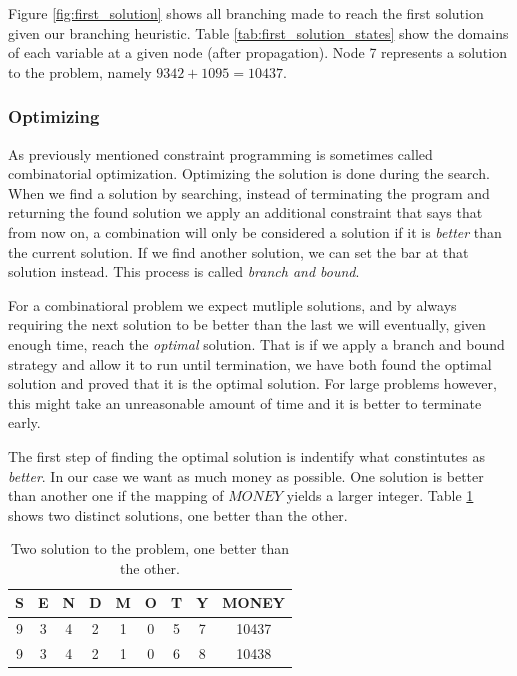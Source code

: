 Figure \ref{fig:first_solution} shows all branching made to reach the first solution given
our branching heuristic. Table \ref{tab:first_solution_states} show the domains of each
variable at a given node (after propagation). Node 7 represents a solution to the problem,
namely $9342+1095=10437$.

\subsubsection{Optimizing}

As previously mentioned constraint programming is sometimes called combinatorial optimization.
Optimizing the solution is done during the search. When we find a solution by searching,
instead of terminating the program and returning the found solution we apply an additional
constraint that says that from now on, a combination will only be considered a solution
if it is \textit{better} than the current solution. If we find another solution, we can
set the bar at that solution instead. This process is called \textit{branch and bound}.

For a combinatioral problem we expect mutliple solutions, and by always requiring the
next solution to be better than the last we will eventually, given enough time, reach
the \textit{optimal} solution. That is if we apply a branch and bound strategy and allow
it to run until termination, we have both found the optimal solution and proved that it is
the optimal solution. For large problems however, this might take an unreasonable amount
of time and it is better to terminate early.

The first step of finding the optimal solution is indentify what constintutes as \textit{
	better}. In our case we want as much money as possible. One solution is better than
another one if the mapping of $MONEY$ yields a larger integer. Table \ref{tab:two_solutions}
shows two distinct solutions, one better than the other.

\begin{table}
	\centering
	\begin{tabular}{c|c|c|c|c|c|c|c|c}
		S & E & N & D & M & O & T & Y & MONEY \\
		\hline
		9 & 3 & 4 & 2 & 1 & 0 & 5 & 7 & 10437 \\
		9 & 3 & 4 & 2 & 1 & 0 & 6 & 8 & 10438 \\
	\end{tabular}
	\caption{Two solution to the problem, one better than the other.}
	\label{tab:two_solutions}
\end{table}

